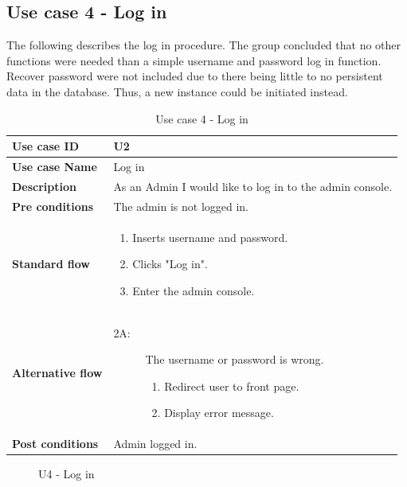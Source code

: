 \clearpage

\subsection{Use case 4 - Log in}

The following describes the log in procedure. The group concluded that no other functions were needed than a simple username and password log in function. Recover password were not included due to there being little to no persistent data in the database. Thus, a new instance could be initiated instead.

\begin{table}[ht!]
\centering
\begin{tabular}{|l|p{5cm}|}
\hline
\textbf{Use case ID} & U2 \\ \hline
\textbf{Use case Name} & Log in \\ \hline
\textbf{Description} & As an Admin I would like to log in to the admin console. \\ \hline
\textbf{Pre conditions} & The admin is not logged in. \\ \hline
\textbf{Standard flow} & \begin{enumerate}
\item Inserts username and password.
\item Clicks "Log in".
\item Enter the admin console. 
\end{enumerate} \\ \hline
\textbf{Alternative flow} & \begin{description}
\item[2A:] The username or password is wrong. \begin{enumerate}
\item Redirect user to front page.
\item Display error message.
\end{enumerate}
\end{description} \\ \hline
\textbf{Post conditions} & Admin logged in. \\ \hline
\end{tabular}
\caption{Use case 4 - Log in}
\label{uc4}
\end{table}

\begin{center}
  \begin{figure}[ht!]
    \caption{U4 - Log in}
    \label{fig:u4}
  \end{figure}
\end{center}


